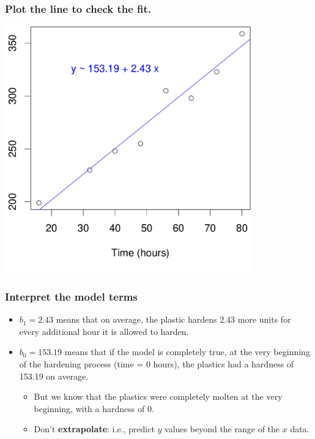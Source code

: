 \documentclass[handout]{beamer}\usepackage[]{graphicx}\usepackage[]{color}
\newenvironment{knitrout}{}{} %
\numberwithin{equation}{section}
\begin{document}
\begin{frame}[fragile]
\frametitle{Plot the line to check the fit.} \small
\begin{center}
\begin{knitrout}
\color{fgcolor}
\includegraphics[width=0.8\textwidth,height=0.8\textheight]{figure/unnamed-chunk-8-1} 

\end{knitrout}

\end{center}
\end{frame}

\begin{frame}
\frametitle{Interpret the model terms}
\begin{itemize}
\item $b_1 = 2.43$ means that on average, the plastic hardens 2.43 more units for every additional hour it is allowed to harden.
\pause \item $b_0 = 153.19$ means that if the model is completely true, at the very beginning of the hardening process (time = 0 hours), the plastics had a hardness of 153.19 on average.
\begin{itemize}
\pause \item But we know that the plastics were completely molten at the very beginning, with a hardness of 0.
\pause \item Don't {\bf extrapolate}: i.e., predict $y$ values beyond the range of the $x$ data. 
\end{itemize}
\end{itemize}
\end{frame}
\end{document}
